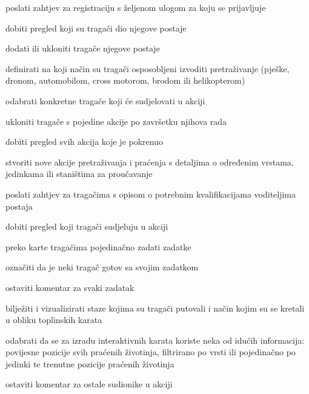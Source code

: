 			
			\begin{packed_enum}
				\item  {}
				
				\begin{packed_enum}
					
					\item poslati zahtjev za registraciju s željenom ulogom za koju se prijavljuje
					
				\end{packed_enum}
				
			
				\item  {}
				
				\begin{packed_enum}
					
					\item dobiti pregled koji su tragači dio njegove postaje					
					\item dodati ili ukloniti tragače njegove postaje
					\item definirati na koji način su tragači osposobljeni izvoditi pretraživanje (pješke, dronom, automobilom, cross motorom, brodom ili helikopterom)
					\item odabrati konkretne tragače koji će sudjelovati u akciji
					\item ukloniti tragače s pojedine akcije po završetku njihova rada
					
				\end{packed_enum}
				
				\item  {}
				
				\begin{packed_enum}
					
					\item dobiti pregled svih akcija koje je pokrenuo
					\item stvoriti nove akcije pretraživanja i praćenja s detaljima o određenim vrstama, jedinkama ili staništima za proučavanje
					\item poslati zahtjev za tragačima s opisom o potrebnim kvalifikacijama voditeljima postaja
					\item dobiti pregled koji tragači sudjeluju u akciji					
					\item preko karte tragačima pojedinačno zadati zadatke
					\item označiti da je neki tragač gotov sa svojim zadatkom
					\item ostaviti komentar za svaki zadatak
					\item bilježiti i vizualizirati staze kojima su tragači putovali i način kojim su se kretali u obliku toplinskih karata  
					\item odabrati da se za izradu interaktivnih karata koriste neka od idućih informacija: povijesne pozicije svih praćenih životinja, filtrirano po vrsti ili pojedinačno po jedinki te trenutne pozicije praćenih životinja 
					\item ostaviti komentar za ostale sudionike u akciji  
					

\end{packed_enum}
\end{packed_enum}
